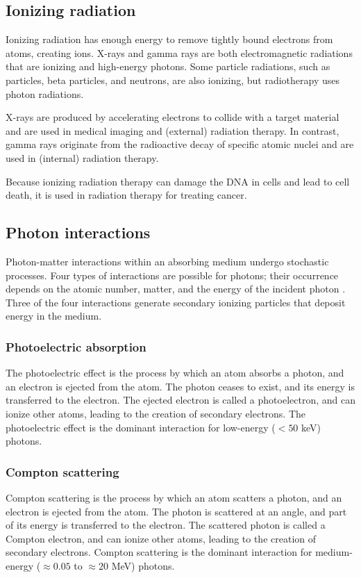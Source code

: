 \subsection{Ionizing radiation}
Ionizing radiation has enough energy to remove tightly bound electrons from atoms, creating ions.
X-rays and gamma rays are both electromagnetic radiations that are ionizing and high-energy photons.
Some particle radiations, such as particles, beta particles, and neutrons, are also ionizing, but radiotherapy uses photon radiations.

X-rays are produced by accelerating electrons to collide with a target material and are used in medical imaging and (external) radiation therapy.
In contrast, gamma rays originate from the radioactive decay of specific atomic nuclei and are used in (internal) radiation therapy. 

Because ionizing radiation therapy can damage the DNA in cells and lead to cell death, it is used in radiation therapy for treating cancer.

\subsection{Photon interactions}
Photon-matter interactions within an absorbing medium undergo stochastic processes.
Four types of interactions are possible for photons; their occurrence depends on the atomic number, matter, and the energy of the incident photon \cite{Evans1958}.
Three of the four interactions generate secondary ionizing particles that deposit energy in the medium.

\subsubsection{Photoelectric absorption}
The photoelectric effect is the process by which an atom absorbs a photon, and an electron is ejected from the atom.
The photon ceases to exist, and its energy is transferred to the electron.
The ejected electron is called a photoelectron, and can ionize other atoms, leading to the creation of secondary electrons.
The photoelectric effect is the dominant interaction for low-energy ($ < 50$ keV) photons.

\subsubsection{Compton scattering}
Compton scattering is the process by which an atom scatters a photon, and an electron is ejected from the atom.
The photon is scattered at an angle, and part of its energy is transferred to the electron.
The scattered photon is called a Compton electron, and can ionize other atoms, leading to the creation of secondary electrons.
Compton scattering is the dominant interaction for medium-energy ($\approx 0.05$ to $\approx 20$ MeV) photons.


